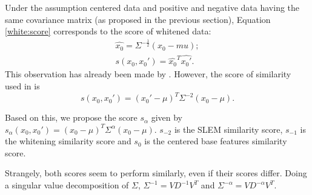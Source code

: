 \documentclass[12pt,letterpaper]{article}
\begin{document}
Under the assumption centered data and positive and negative data having the same covariance matrix (as proposed in the previous section), Equation \ref{white:score} corresponds to the score of whitened data:
\begin{align}
\hat{x_0} = \Sigma^{-\frac{1}{2}}(x_0-mu);\\
s(x_0,x_0') = \hat{x_0}^T\hat{x_0'}.
\end{align}
This observation has already been made by \cite{Koba15}. However, the score of similarity used in \cite{ZePe15} is
\begin{equation}
s(x_0,x_0') = (x_0'-\mu)^T\Sigma^{-2}(x_0-\mu). \label{esvm:score}
\end{equation}

Based on this, we propose the score $s_{\alpha}$ given by $s_{\alpha}(x_0,x_0') = (x_0-\mu)^T\Sigma^{\alpha}(x_0-\mu).$ $s_{-2}$ is the SLEM similarity score, $s_{-1}$ is the whitening similarity score and $s_{0}$ is the centered base features similarity score.

Strangely, both scores seem to perform similarly, even if their scores differ. Doing a singular value decomposition of $\Sigma$, $\Sigma^{-1}=VD^{-1}V^T$ and $\Sigma^{-\alpha}=VD^{-\alpha}V^T$.
\end{document}
